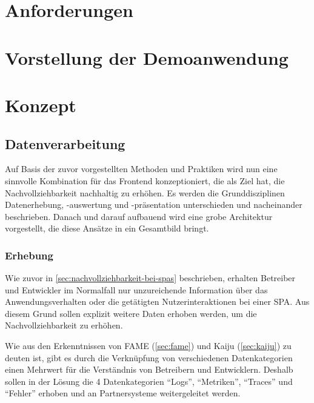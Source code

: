 	
\section{Anforderungen}

	
\section{Vorstellung der Demoanwendung}

	
	
\section{Konzept}
	
	\subsection{Datenverarbeitung}

	Auf Basis der zuvor vorgestellten Methoden und Praktiken wird nun eine sinnvolle Kombination für das Frontend konzeptioniert, die als Ziel hat, die Nachvollziehbarkeit nachhaltig zu erhöhen. Es werden die Grunddisziplinen Datenerhebung, -auswertung und -präsentation unterschieden und nacheinander beschrieben. Danach und darauf aufbauend wird eine grobe Architektur vorgestellt, die diese Ansätze in ein Gesamtbild bringt.
		
	\subsubsection{Erhebung}
	
	Wie zuvor in \autoref{sec:nachvollziehbarkeit-bei-spas} beschrieben, erhalten Betreiber und Entwickler im Normalfall nur unzureichende Information über das Anwendungsverhalten oder die getätigten Nutzerinteraktionen bei einer SPA. Aus diesem Grund sollen explizit weitere Daten erhoben werden, um die Nachvollziehbarkeit zu erhöhen.
	
	Wie aus den Erkenntnissen von FAME (\autoref{sec:fame}) und Kaiju (\autoref{sec:kaiju}) zu deuten ist, gibt es durch die Verknüpfung von verschiedenen Datenkategorien einen Mehrwert für die Verständnis von Betreibern und Entwicklern. Deshalb sollen in der Lösung die 4 Datenkategorien \enquote{Logs}, \enquote{Metriken}, \enquote{Traces} und \enquote{Fehler} erhoben und an Partnersysteme weitergeleitet werden.
	
